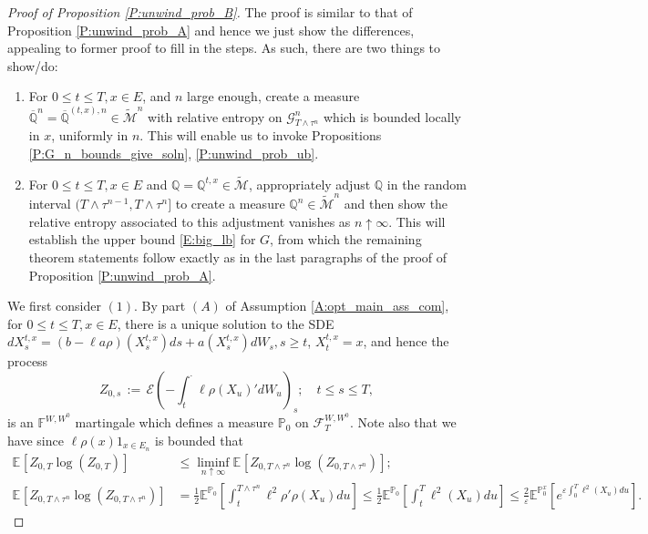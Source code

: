 \documentclass[11pt, letterpaper]{amsart}
\theoremstyle{definition}
\theoremstyle{remark}
\numberwithin{equation}{section}
\newcommand{\eps}{\varepsilon}
\newcommand{\prob}{\mathbb{P}}
\newcommand{\qprob}{\mathbb{Q}}
\newcommand{\esp}{\mathbb{E}}
\newcommand{\espalt}[2]{\esp^{#1}\bra{#2}}
\newcommand{\F}{\mathcal{F}}
\newcommand{\G}{\mathcal{G}}
\newcommand{\tM}{\widetilde{\mathcal{M}}}
\newcommand{\filt}{\mathbb{F}}
\newcommand{\EN}{\mathcal{E}}
\newcommand{\dfn}{\, := \,}
\newcommand{\bra}[1]{\left[#1\right]}
\newcommand{\ol}[1]{\overline{#1}}
\begin{document}
\begin{proof}[Proof of Proposition \ref{P:unwind_prob_B}]

The proof is similar to that of Proposition \ref{P:unwind_prob_A} and hence we just show the differences, appealing to former proof to fill in the steps.   As such, there are two things to show/do:
\begin{enumerate}[(1)]
\item For $0\leq t\leq T, x\in E$, and $n$ large enough, create a measure $\ol{\qprob}^n = \ol{\qprob}^{(t,x),n}\in \tM^n$ with relative entropy on $\G^n_{T\wedge\tau^n}$ which is bounded locally in $x$, uniformly in $n$. This will enable us to invoke Propositions \ref{P:G_n_bounds_give_soln}, \ref{P:unwind_prob_ub}.
\item For $0\leq t\leq T, x\in E$ and $\qprob = \qprob^{t,x}\in \tM$, appropriately adjust $\qprob$ in the random interval $(T\wedge\tau^{n-1},T\wedge\tau^n]$ to create a measure $\qprob^n\in\tM^n$ and then show the relative entropy associated to this adjustment vanishes as $n\uparrow\infty$. This will establish the upper bound \eqref{E:big_lb} for $G$, from which the remaining theorem statements follow exactly as in the last paragraphs of the proof of Proposition \ref{P:unwind_prob_A}.
\end{enumerate}
We first consider $(1)$. By part $(A)$ of Assumption \ref{A:opt_main_ass_com}, for $0\leq t\leq T, x\in E$, there is a unique solution to the SDE $dX^{t,x}_s = \left(b-\ell a\rho\right)(X^{t,x}_s)ds + a(X^{t,x}_s)dW_s, s\geq t$, $X^{t,x}_t = x$, and hence the process
\begin{equation*}
Z_{0,s}\dfn \EN\left(-\int_t^\cdot \ell\rho(X_u)'dW_u\right)_s;\quad t\leq s\leq T,
\end{equation*}
is an $\filt^{W,W^0}$ martingale which defines a measure $\prob_0$ on $\F^{W,W^0}_T$.  Note also that we have since $\ell\rho(x)1_{x\in E_n}$ is bounded that
\begin{equation}\label{E:com_temp_calc}
\begin{split}
\espalt{}{Z_{0,T}\log\left(Z_{0,T}\right)} &\leq \liminf_{n\uparrow\infty} \espalt{}{Z_{0,T\wedge\tau^n}\log\left(Z_{0,T\wedge\tau^n}\right)};\\
\espalt{}{Z_{0,T\wedge\tau^n}\log\left(Z_{0,T\wedge\tau^n}\right)} &= \frac{1}{2}\espalt{\prob_0}{\int_t^{T\wedge\tau^n} \ell^2\rho'\rho(X_u)du} \leq \frac{1}{2}\espalt{\prob_0}{\int_t^T \ell^2(X_u)du} \leq \frac{2}{\eps}\espalt{\prob^x_{0}}{e^{\eps\int_0^T \ell^2(X_u)du}}.
\end{split}

\end{equation}
\end{proof}
\end{document}
